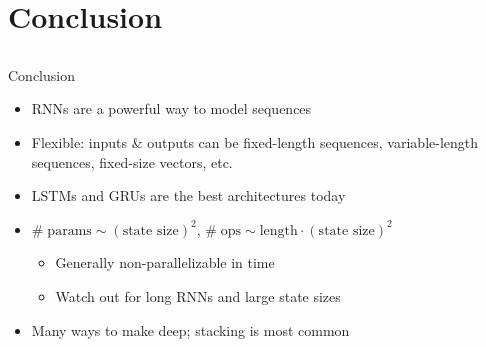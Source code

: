 \section{Conclusion}
\subsection{}

\begin{frame}{Conclusion}
    \begin{itemize}
        \item RNNs are a powerful way to model sequences
        \item Flexible: inputs \& outputs can be fixed-length sequences, variable-length sequences, fixed-size vectors, etc.
        \item LSTMs and GRUs are the best architectures today
        \item $\# \; \text{params} \sim (\text{state size})^2$,
        $\# \; \text{ops} \sim \text{length} \cdot (\text{state size})^2$
        \begin{itemize}
            \item Generally non-parallelizable in time
            \item Watch out for long RNNs and large state sizes
        \end{itemize}
        \item Many ways to make deep; stacking is most common
    \end{itemize}
\end{frame}

